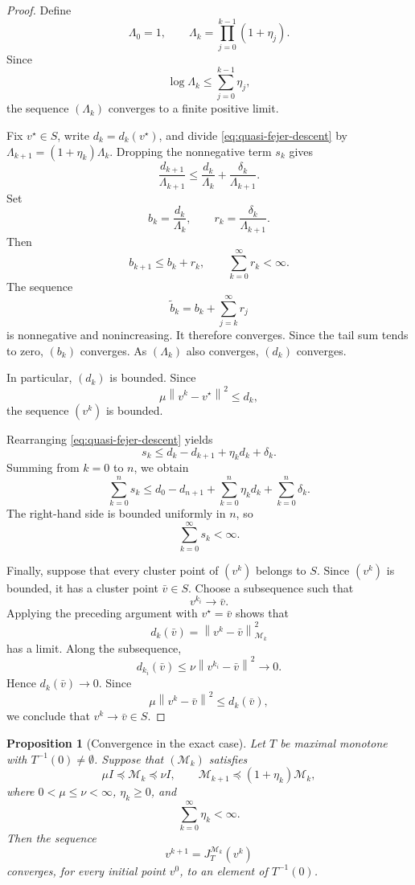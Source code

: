 \documentclass[a4paper,11pt]{book}
\theoremstyle{plain}
\newtheorem{proposition}[theorem]{Proposition}
\theoremstyle{definition}
\theoremstyle{remark}
\numberwithin{equation}{chapter}
\numberwithin{algorithm}{chapter}
\newcommand{\norm}[1]{\left\|#1\right\|}
\begin{document}
	\begin{proof}
		Define
		\[
		\Lambda_0=1,
		\qquad
		\Lambda_k=\prod_{j=0}^{k-1}(1+\eta_j).
		\]
		Since
		\[
		\log\Lambda_k
		\leq
		\sum_{j=0}^{k-1}\eta_j,
		\]
		the sequence \((\Lambda_k)\) converges to a finite positive limit.
		
		Fix \(v^\star\in S\), write \(d_k=d_k(v^\star)\), and divide
		\eqref{eq:quasi-fejer-descent} by
		\(\Lambda_{k+1}=(1+\eta_k)\Lambda_k\). Dropping the nonnegative term \(s_k\)
		gives
		\[
		\frac{d_{k+1}}{\Lambda_{k+1}}
		\leq
		\frac{d_k}{\Lambda_k}
		+
		\frac{\delta_k}{\Lambda_{k+1}}.
		\]
		Set
		\[
		b_k=\frac{d_k}{\Lambda_k},
		\qquad
		r_k=\frac{\delta_k}{\Lambda_{k+1}}.
		\]
		Then
		\[
		b_{k+1}\leq b_k+r_k,
		\qquad
		\sum_{k=0}^{\infty}r_k<\infty.
		\]
		The sequence
		\[
		\widetilde b_k
		=
		b_k+\sum_{j=k}^{\infty}r_j
		\]
		is nonnegative and nonincreasing. It therefore converges. Since the tail
		sum tends to zero, \((b_k)\) converges. As \((\Lambda_k)\) also converges,
		\((d_k)\) converges.
		
		In particular, \((d_k)\) is bounded. Since
		\[
		\mu\norm{v^k-v^\star}^2\leq d_k,
		\]
		the sequence \((v^k)\) is bounded.
		
		Rearranging \eqref{eq:quasi-fejer-descent} yields
		\[
		s_k
		\leq
		d_k-d_{k+1}+\eta_kd_k+\delta_k.
		\]
		Summing from \(k=0\) to \(n\), we obtain
		\[
		\sum_{k=0}^{n}s_k
		\leq
		d_0-d_{n+1}
		+
		\sum_{k=0}^{n}\eta_kd_k
		+
		\sum_{k=0}^{n}\delta_k.
		\]
		The right-hand side is bounded uniformly in \(n\), so
		\[
		\sum_{k=0}^{\infty}s_k<\infty.
		\]
		
		Finally, suppose that every cluster point of \((v^k)\) belongs to \(S\).
		Since \((v^k)\) is bounded, it has a cluster point \(\bar v\in S\). Choose
		a subsequence such that
		\[
		v^{k_i}\longrightarrow\bar v.
		\]
		Applying the preceding argument with \(v^\star=\bar v\) shows that
		\[
		d_k(\bar v)
		=
		\norm{v^k-\bar v}_{\mathcal M_k}^2
		\]
		has a limit. Along the subsequence,
		\[
		d_{k_i}(\bar v)
		\leq
		\nu\norm{v^{k_i}-\bar v}^2
		\longrightarrow0.
		\]
		Hence \(d_k(\bar v)\to0\). Since
		\[
		\mu\norm{v^k-\bar v}^2
		\leq
		d_k(\bar v),
		\]
		we conclude that \(v^k\to\bar v\in S\).
	\end{proof}
	
	\begin{proposition}[Convergence in the exact case]
		Let \(T\) be maximal monotone with \(T^{-1}(0)\neq\emptyset\). Suppose that
		\((\mathcal M_k)\) satisfies
		\begin{equation}
			\mu I\preceq\mathcal M_k\preceq\nu I,
			\qquad
			\mathcal M_{k+1}\preceq(1+\eta_k)\mathcal M_k,
			\label{eq:variable-metric-assumptions}
		\end{equation}
		where \(0<\mu\leq\nu<\infty\), \(\eta_k\geq0\), and
		\[
		\sum_{k=0}^{\infty}\eta_k<\infty.
		\]
		Then the sequence
		\begin{equation}
			v^{k+1}=J_T^{\mathcal M_k}(v^k)
		\end{equation}
		converges, for every initial point \(v^0\), to an element of \(T^{-1}(0)\).
	\end{proposition}
	
\end{document}
